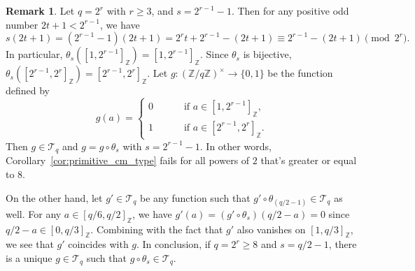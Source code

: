 \documentclass{amsart}[11pt]
\theoremstyle{definition}
\newtheorem{rem}[thm]{Remark}
\numberwithin{equation}{section}
\theoremstyle{notitle}
\begin{document}
\begin{rem}
\label{subsec:uniqueness-of-g-in-case-q-is-power-of-2}
  Let $q=2^r$ with $r\geq 3$, and $s=2^{r-1}-1$. Then for any positive
  odd number $2t+1<2^{r-1}$, we have 
\[ s(2t+1) = (2^{r-1}-1)(2t+1)= 2^rt+2^{r-1}-(2t+1)\equiv
2^{r-1}-(2t+1) \pmod{2^r}.\]
In particular, $\theta_s([1, 2^{r-1}]_{\mathbb{Z}})=[1,
2^{r-1}]_{\mathbb{Z}}$. Since $\theta_s$ is bijective, $\theta_s([2^{r-1}, 2^r]_{\mathbb{Z}})=[2^{r-1}, 2^r]_{\mathbb{Z}}$. Let $g: ({\mathbb{Z}}/q{\mathbb{Z}})^\times\to \{ 0,1\}$ be the
function defined by
\begin{equation}
  \label{eq:30}
 g(a)=\left\{
\begin{aligned}
  0 \qquad &\text{ if } a\in [1, 2^{r-1}]_{\mathbb{Z}}, \\
  1 \qquad &\text{ if } a\in [2^{r-1}, 2^r]_{\mathbb{Z}}.
\end{aligned}\right.
\end{equation}
Then $g\in {\mathscr{T}}_q$ and $g=g\circ \theta_s$ with $s=2^{r-1}-1$. In other
words, Corollary~\ref{cor:primitive_cm_type} fails for all powers of
$2$ that's greater or equal to $8$.

On the other hand, let $g'\in {\mathscr{T}}_q$ be any function such that
$g'\circ \theta_{(q/2-1)}\in {\mathscr{T}}_q$ as well. For any $a\in [q/6,
q/2]_{\mathbb{Z}}$, we have $g'(a)= (g'\circ \theta_s)(q/2-a)=0$ since
$q/2-a\in [0, q/3]_{\mathbb{Z}}$. Combining with the fact that $g'$ also
vanishes on $[1, q/3]_{\mathbb{Z}}$, we see that $g'$ coincides with $g$.  In
conclusion, if $q=2^r\geq 8$ and $s=q/2-1$, there is a unique $g\in
{\mathscr{T}}_q$ such that $g\circ \theta_s\in {\mathscr{T}}_q$.
\end{rem}
\end{document}
